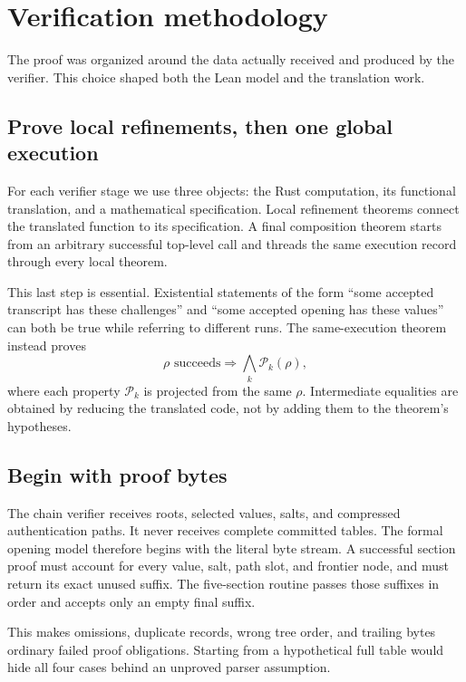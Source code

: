 \section{Verification methodology}
\label{sec:proof-design}

The proof was organized around the data actually received and produced by the
verifier.  This choice shaped both the Lean model and the translation work.

\subsection{Prove local refinements, then one global execution}

For each verifier stage we use three objects: the Rust computation, its
functional translation, and a mathematical specification.  Local refinement
theorems connect the translated function to its specification.  A final
composition theorem starts from an arbitrary successful top-level call and threads the
same execution record through every local theorem.

This last step is essential.  Existential statements of the form ``some
accepted transcript has these challenges'' and ``some accepted opening has
these values'' can both be true while referring to different runs.  The
same-execution theorem instead proves
\[
  \rho\text{ succeeds}
  \Longrightarrow
  \bigwedge_k \mathcal P_k(\rho),
\]
where each property \(\mathcal P_k\) is projected from the same \(\rho\).
Intermediate equalities are obtained by reducing the translated code, not by
adding them to the theorem's hypotheses.

\subsection{Begin with proof bytes}

The chain verifier receives roots, selected values, salts, and compressed
authentication paths.  It never receives complete committed tables.  The
formal opening model therefore begins with the literal byte stream.  A
successful section proof must account for every value, salt, path slot, and
frontier node, and must return its exact unused suffix.  The five-section
routine passes those suffixes in order and accepts only an empty final suffix.

This makes omissions, duplicate records, wrong tree order, and trailing bytes
ordinary failed proof obligations.  Starting from a hypothetical full table
would hide all four cases behind an unproved parser assumption.

